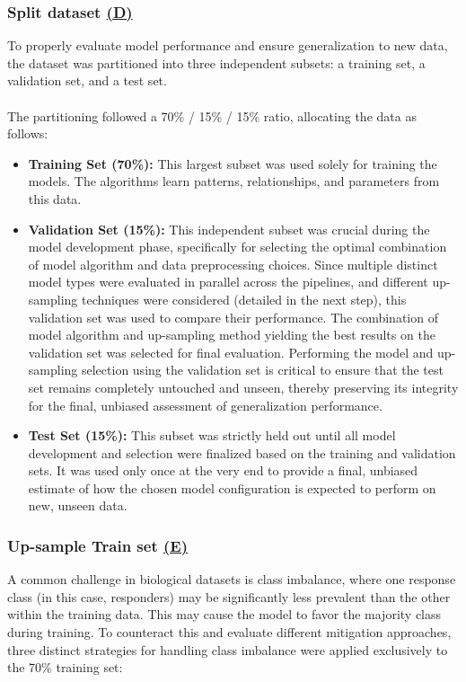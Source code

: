 \documentclass[12pt,a4paper]{report}
\begin{document}
\subsubsection*{Split dataset \hyperref[fig:pipeline-1]{(D)}}
To properly evaluate model performance and ensure generalization to new data, the dataset was partitioned into three independent subsets: a training set, a validation set, and a test set.\\
\\
The partitioning followed a 70\% / 15\% / 15\% ratio, allocating the data as follows:
\begin{itemize}
    \item \textbf{Training Set (70\%):} This largest subset was used solely for training the models. The algorithms learn patterns, relationships, and parameters from this data.
    \item \textbf{Validation Set (15\%):} This independent subset was crucial during the model development phase, specifically for selecting the optimal combination of model algorithm and data preprocessing choices. Since multiple distinct model types were evaluated in parallel across the pipelines, and different up-sampling techniques were considered (detailed in the next step), this validation set was used to compare their performance. The combination of model algorithm and up-sampling method yielding the best results on the validation set was selected for final evaluation. Performing the model and up-sampling selection using the validation set is critical to ensure that the test set remains completely untouched and unseen, thereby preserving its integrity for the final, unbiased assessment of generalization performance.
    \item \textbf{Test Set (15\%):} This subset was strictly held out until all model development and selection were finalized based on the training and validation sets. It was used only once at the very end to provide a final, unbiased estimate of how the chosen model configuration is expected to perform on new, unseen data.
\end{itemize}

\subsubsection*{Up-sample Train set \hyperref[fig:pipeline-1]{(E)}}
A common challenge in biological datasets is class imbalance, where one response class (in this case, responders) may be significantly less prevalent than the other within the training data. This may cause the model to favor the majority class during training. To counteract this and evaluate different mitigation approaches, three distinct strategies for handling class imbalance were applied exclusively to the 70\% training set:
\end{document}
